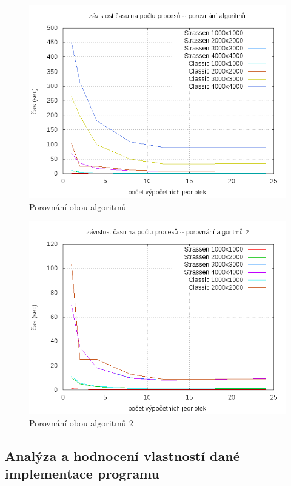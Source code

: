 \documentclass[12pt,a4paper]{article}
\begin{document}
\begin{figure}[h]
\includegraphics[width=\textwidth]{graph/classic-vs-strassen.png}
\caption{Porovnání obou algoritmů}
\label{data4}
\end{figure}

\pagebreak
\begin{figure}[h]
\includegraphics[width=\textwidth]{graph/classic-vs-strassen-2.png}
\caption{Porovnání obou algoritmů 2}
\label{data4}
\end{figure}


\pagebreak
\subsection{Analýza a hodnocení vlastností dané implementace programu}
\end{document}
